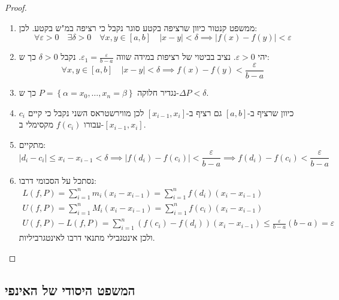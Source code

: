 \documentclass{tstextbook}
\begin{document}
\begin{proof}
  \begin{enumerate}
    \item ממשפט קנטור כיוון שרציפה בקטע סוגר נקבל כי רציפה במ"ש בקטע. לכן: 
$$\forall \varepsilon>0 \quad \exists \delta> 0\quad \forall x,y \in[a,b]\quad \lvert x-y \rvert <\delta\implies \lvert f(x)-f(y) \rvert <\varepsilon$$


    \item יהי \(\varepsilon>0\). נציב בביטוי של רציפות במידה שווה \(\varepsilon_{1}=\frac{\varepsilon}{b-a}\). נקבל \(\delta> 0\) כך ש: 
$$\forall x,y \in [a,b]\quad \lvert x-y \rvert <\delta\implies f(x)-f(y)<\frac{\varepsilon}{b-a}$$


    \item נגדיר חלוקה \(P=\left\{  \alpha=x_{0},\dots,x_{n}=\beta  \right\}\) כך ש-\(\Delta P<\delta\). 


    \item כיוון שרציף ב-\([a,b]\) גם רציף ב-\([x_{i-1},x_{i}]\) לכן מווירשטראס השני נקבל כי קיים \(c_{i}\) עבורו \(f(c_{i})\) מקסימלי ב-\([x_{i-1},x_{i}]\). 


    \item מתקיים: 
$$\lvert d_{i}-c_{i} \rvert \leq x_{i}-x_{i-1}<\delta\implies \lvert f(d_{i})-f(c_{i}) \rvert <\frac{\varepsilon}{b-a}\implies f(d_{i})-f(c_{i})<\frac{\varepsilon}{b-a}$$


    \item נסתכל על הסכומי דרבו: 
$$\begin{gather}L(f,P)=\sum_{i=1}^{n} m_{i}(x_{i}-x_{i-1})=\sum_{i=1}^{n} f(d_{i})(x_{i}-x_{i-1})  \\U(f,P)=\sum_{i=1}^{n} M_{i}(x_{i}-x_{i-1})=\sum_{i=1}^{n} f(c_{i})(x_{i}-x_{i-1}) \\U(f,P)-L(f,P)=\sum_{i=1}^{n} (f(c_{i})-f(d_{i}))(x_{i}-x_{i-1})\leq \frac{\varepsilon}{b-a}(b-a)=\varepsilon
\end{gather}$$
ולכן אינטגבילי מתנאי דרבו לאינטגרביליות.


  \end{enumerate}
\end{proof}
\subsection{המשפט היסודי של האינפי}
\end{document}
